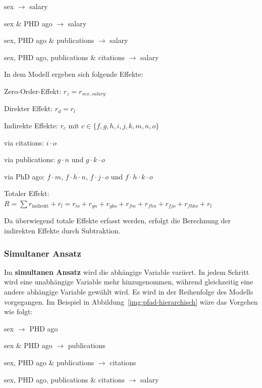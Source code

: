 \documentclass{article}
\numberwithin{equation}{section}
\begin{document}
\begin{compactenum}
\item sex $\to$ salary
\item sex \& PHD ago $\to$ salary
\item sex, PHD ago \& publications $\to$ salary
\item sex, PHD ago, publications \& citations $\to$ salary
\end{compactenum}

In dem Modell ergeben sich folgende Effekte:

\begin{compactitem}
\item Zero-Order-Effekt: $r_z = r_{sex,salary}$
\item Direkter Effekt: $r_d = r_l$
\item Indirekte Effekte: $r_c$ mit $c \in \{f,g,h,i,j,k,m,n,o\}$
  \begin{compactitem}
  \item via citations: $i \cdot o$
  \item via publications: $g \cdot n$ und $g \cdot k \cdot o$
  \item via PhD ago: $f \cdot m$, $f \cdot h \cdot n$, $f \cdot j \cdot o$ und $f \cdot h \cdot k \cdot o$
  \end{compactitem}
\item Totaler Effekt: $R = \sum r_{\text{indirekt}} + r_l = r_{io} + r_{gn} + r_{gko} + r_{fm} + r_{fhn} + r_{fjo} + r_{fhko} + r_l$
\end{compactitem}

Da überwiegend totale Effekte erfasst werden, erfolgt die Berechnung der indirekten Effekte durch Subtraktion.

\subsubsection{Simultaner Ansatz}

Im \textbf{simultanen Ansatz} wird die abhängige Variable variiert. In jedem Schritt wird eine unabhängige Variable mehr hinzugenommen, während gleichzeitig eine andere abhängige Variable gewählt wird. Es wird in der Reihenfolge des Modells vorgegangen. Im Beispiel in Abbildung~\ref{img:pfad-hierarchisch} wäre das Vorgehen wie folgt:

\begin{compactenum}
\item sex $\to$ PHD ago
\item sex \& PHD ago $\to$ publications
\item sex, PHD ago \& publications $\to$ citations
\item sex, PHD ago, publications \& citations $\to$ salary
\end{compactenum}
\end{document}
